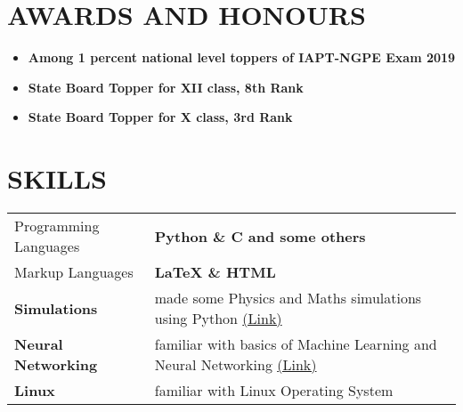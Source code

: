 \documentclass[12pt]{article}
\begin{document}
\section*{AWARDS AND HONOURS}
\begin{itemize}
    \item{\bfseries Among 1 percent national level toppers of  IAPT-NGPE Exam 2019}
	\item{\bfseries State Board Topper for XII class, 8th Rank}
	\item{\bfseries State Board Topper for X class, 3rd Rank}
\end{itemize}

\section*{SKILLS}
\begin{tabular}{l@{\hskip 0.5in}l}
    Programming Languages & \textbf{Python \& C and some others}\\
	\vspace{0.5em}
    Markup Languages & \textbf{LaTeX \& HTML}\\
	\vspace{0.5em}
    \textbf{Simulations} & made some Physics and Maths simulations using Python \href{https://drive.google.com/drive/folders/111GkPUsfI-T3w1g3KbAKO7RY5q6JeLaL?usp=sharing}{(Link)}\\
	\vspace{0.5em}
    \textbf{Neural Networking} & familiar with basics of Machine Learning and Neural Networking \href{https://github.com/vikaskaushikkarora/neuralNetworks}{(Link)}\\
	\vspace{0.5em}
    \textbf{Linux} & familiar with Linux Operating System\\
\end{tabular}\\

\end{document}
